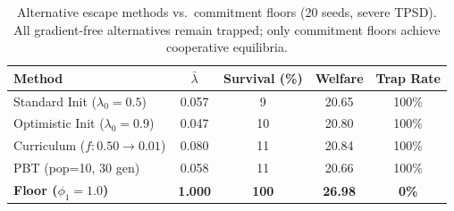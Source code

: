 \begin{table}[t]
\centering
\caption{Alternative escape methods vs.\ commitment floors (20 seeds, severe TPSD). All gradient-free alternatives remain trapped; only commitment floors achieve cooperative equilibria.}
\label{tab:alternative_baselines}
\small
\begin{tabular}{lcccc}
\toprule
Method & $\bar\lambda$ & Survival (\%) & Welfare & Trap Rate \\
\midrule
Standard Init ($\lambda_0{=}0.5$) & 0.057 & 9 & 20.65 & 100\% \\
Optimistic Init ($\lambda_0{=}0.9$) & 0.047 & 10 & 20.80 & 100\% \\
Curriculum ($f{:}0.50{\to}0.01$) & 0.080 & 11 & 20.84 & 100\% \\
PBT (pop=10, 30 gen) & 0.058 & 11 & 20.66 & 100\% \\
\midrule
\textbf{Floor ($\phi_1{=}1.0$)} & \textbf{1.000} & \textbf{100} & \textbf{26.98} & \textbf{0\%} \\
\bottomrule
\end{tabular}
\end{table}
